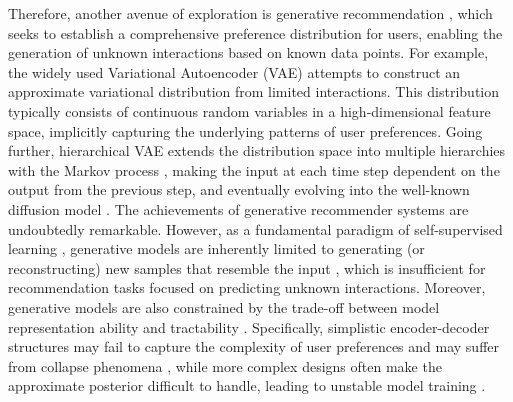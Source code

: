 \documentclass[sigconf]{acmart}
\begin{document}
Therefore, another avenue of exploration is generative recommendation \cite{yu2019vaegan, wang2017irgan, liang2018variational, wang2023diffusion}, which seeks to establish a comprehensive preference distribution for users, enabling the generation of unknown interactions based on known data points. For example, the widely used Variational Autoencoder (VAE) \cite{kingma2013auto, liang2018variational} attempts to construct an approximate variational distribution from limited interactions. This distribution typically consists of continuous random variables in a high-dimensional feature space, implicitly capturing the underlying patterns of user preferences. Going further, hierarchical VAE \cite{sonderby2016ladder} extends the distribution space into multiple hierarchies with the Markov process \cite{luo2022understanding}, making the input at each time step dependent on the output from the previous step, and eventually evolving into the well-known diffusion model \cite{ho2020denoising, wang2023diffusion}. The achievements of generative recommender systems are undoubtedly remarkable. However, as a fundamental paradigm of self-supervised learning \cite{liu2021self, yu2023self}, generative models are inherently limited to generating (or reconstructing) new samples that resemble the input \cite{kingma2013auto}, which is insufficient for recommendation tasks focused on predicting unknown interactions. Moreover, generative models are also constrained by the trade-off between model representation ability and tractability \cite{kingma2016improved}. Specifically, simplistic encoder-decoder structures may fail to capture the complexity of user preferences and may suffer from collapse phenomena \cite{wang2022posterior}, while more complex designs often make the approximate posterior difficult to handle, leading to unstable model training \cite{sohl2015deep, takahashi2019variational}.
\end{document}
